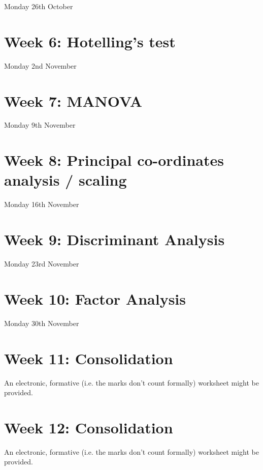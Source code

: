 \documentclass[11pt]{book}
\begin{document}
Monday 26th October




%

\chapter{Week 6: Hotelling's test}

Monday 2nd November



\chapter{Week 7: MANOVA}

Monday 9th November



\chapter{Week 8: Principal co-ordinates analysis / scaling}

Monday 16th November



\chapter{Week 9: Discriminant Analysis}

Monday 23rd November



\chapter{Week 10: Factor Analysis}

Monday 30th November



\chapter{Week 11: Consolidation}

An electronic, formative (i.e. the marks don't count formally) worksheet might be provided.


\chapter{Week 12: Consolidation}

An electronic, formative (i.e. the marks don't count formally) worksheet might be provided.
\end{document}

